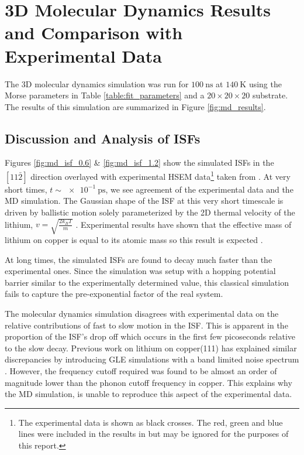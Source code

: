 
\chapter{3D Molecular Dynamics Results and Comparison with Experimental Data}

The 3D molecular dynamics simulation was run for $\SI{100}{\nano\second}$ at $\SI{140}{\kelvin}$ using the Morse parameters in Table \ref{table:fit_parameters} and a $20\times20\times20$ substrate. The results of this simulation are summarized in Figure \ref{fig:md_results}.

\section{Discussion and Analysis of ISFs}

Figures \ref{fig:md_isf_0.6} \& \ref{fig:md_isf_1.2} show the simulated ISFs in the $\left[11\bar{2}\right]$ direction overlayed with experimental HSEM data\footnote{The experimental data is shown as black crosses. The red, green and blue lines were included in the results in \cite{Ward} but may be ignored for the purposes of this report.\label{rgb_lines}} taken from \cite{Ward}. At very short times, $t \sim \SI{e-1}{\pico\second}$, we see agreement of the experimental data and the MD simulation. The Gaussian shape of the ISF at this very short timescale is driven by ballistic motion solely parameterized by the 2D thermal velocity of the lithium, $v=\sqrt{\frac{2k_BT}{m}}$ \cite{Ward}. Experimental results have shown that the effective mass of lithium on copper is equal to its atomic mass so this result is expected \cite{Ward}. 

At long times, the simulated ISFs are found to decay much faster than the experimental ones. Since the simulation was setup with a hopping potential barrier similar to the experimentally determined value, this classical simulation fails to capture the pre-exponential factor of the real system. 

The molecular dynamics simulation disagrees with experimental data on the relative contributions of fast to slow motion in the ISF. This is apparent in the proportion of the ISF's drop off which occurs in the first few picoseconds relative to the slow decay. Previous work on lithium on copper(111) has explained similar discrepancies by introducing GLE simulations with a band limited noise spectrum \cite{Ward}. However, the frequency cutoff required was found to be almost an order of magnitude lower than the phonon cutoff frequency in copper. This explains why the MD simulation, is unable to reproduce this aspect of the experimental data.

